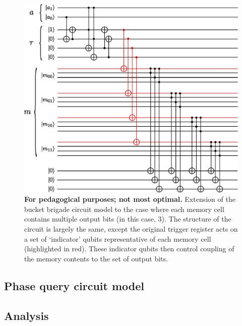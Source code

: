 \documentclass[a4paper,12pt]{article}
\begin{document}
{{\begin{figure}
 \centering
 \captionsetup{width=.89\linewidth}
 \includegraphics[scale=0.8]{fig/bb-2qubit-3bitout}
 \caption{\textbf{For pedagogical purposes; not most optimal.} Extension of the bucket brigade circuit model to the case where each memory cell contains multiple output bits (in this case, 3). The structure of the circuit is largely the same, except the original trigger register acts on a set of `indicator' qubits representative of each memory cell (highlighted in red). These indicator qubits then control coupling of the memory contents to the set of output bits.}
 \label{fig:bb-multioutput}
\end{figure}


\subsection{Phase query circuit model}

\subsection{Analysis}



}}
\end{document}
